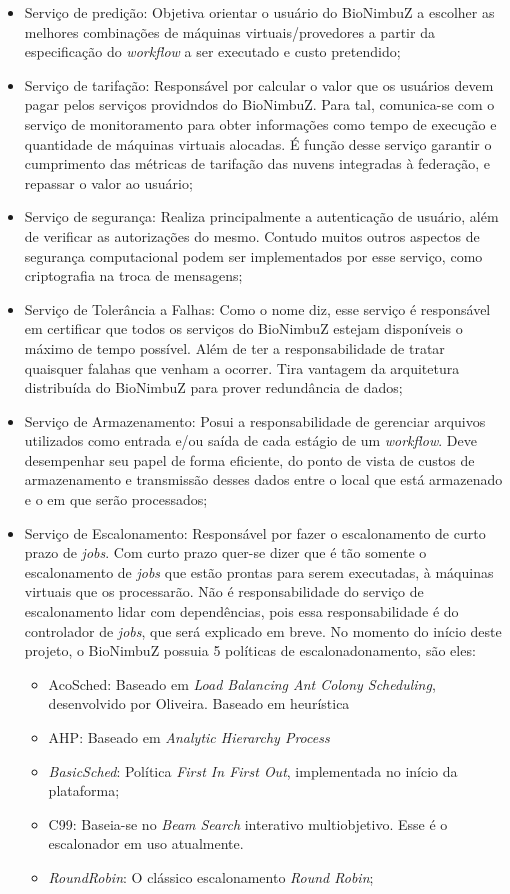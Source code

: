 	\begin{itemize}
		\item Serviço de predição: Objetiva orientar o usuário do BioNimbuZ a escolher as melhores combinações de máquinas virtuais/provedores a partir da especificação do \textit{workflow} a ser executado e custo pretendido;
		\item Serviço de tarifação: Responsável por calcular o valor que os usuários devem pagar pelos serviços providndos do BioNimbuZ. Para tal, comunica-se com o serviço de monitoramento para obter informações como tempo de execução e quantidade de máquinas virtuais alocadas. É função desse serviço garantir o cumprimento das métricas de tarifação das nuvens integradas à federação, e repassar o valor ao usuário;
		\item Serviço de segurança: Realiza principalmente a autenticação de usuário, além de verificar as autorizações do mesmo. Contudo muitos outros aspectos de segurança computacional podem ser implementados por esse serviço, como criptografia na troca de mensagens;
		\item Serviço de Tolerância a Falhas: Como o nome diz, esse serviço é responsável em certificar que todos os serviços do BioNimbuZ estejam disponíveis o máximo de tempo possível. Além de ter a responsabilidade de tratar quaisquer falahas que venham a ocorrer. Tira vantagem da arquitetura distribuída do BioNimbuZ para prover redundância de dados;
		\item Serviço de Armazenamento: Posui a responsabilidade de gerenciar arquivos utilizados como entrada e/ou saída de cada estágio de um \textit{workflow}. Deve desempenhar seu papel de forma eficiente, do ponto de vista de custos de armazenamento e transmissão desses dados entre o local que está armazenado e o em que serão processados;
		\item Serviço de Escalonamento: Responsável por fazer o escalonamento de curto prazo de \textit{jobs}. Com curto prazo quer-se dizer que é tão somente o escalonamento de \textit{jobs} que estão prontas para serem executadas, à máquinas virtuais que os processarão. Não é responsabilidade do serviço de escalonamento lidar com dependências, pois essa responsabilidade é do controlador de \textit{jobs}, que será explicado em breve.
		No momento do início deste projeto, o BioNimbuZ possuia 5 políticas de escalonadonamento, são eles:
		\begin{itemize}
			\item AcoSched: Baseado em \textit{Load Balancing Ant Colony Scheduling}, desenvolvido por Oliveira. Baseado em heurística\cite{6732620_BioNimbuZ_ACOsched}
			\item AHP: Baseado em \textit{Analytic Hierarchy Process}\cite{6732620_BioNimbuZ_ACOsched}
			\item \textit{BasicSched}: Política \textit{First In First Out}, implementada no início da plataforma;
			\item C99: Baseia-se no \textit{Beam Search} interativo multiobjetivo. \cite{BioNimbuZ_Willian_C99} Esse é o escalonador em uso atualmente.
			\item \textit{RoundRobin}: O clássico escalonamento \textit{Round Robin};
		\end{itemize}
	

\end{itemize}
